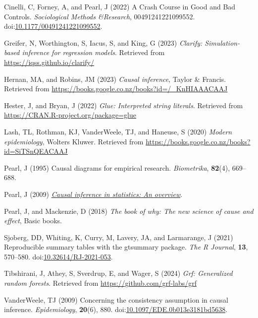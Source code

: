 \documentclass[
  singlecolumn]{article}
\newlength{\cslhangindent}
\newenvironment{CSLReferences}[2] %
 {\begin{list}{}{%
  \setlength{\itemindent}{0pt}
  \setlength{\leftmargin}{0pt}
  \setlength{\parsep}{0pt}
  \ifodd #1
   \setlength{\leftmargin}{\cslhangindent}
   \setlength{\itemindent}{-1\cslhangindent}
  \fi
  \setlength{\itemsep}{#2\baselineskip}}}
 {\end{list}}
\begin{document}
\label{refs}
\begin{CSLReferences}{1}{0}
Cinelli, C, Forney, A, and Pearl, J (2022) A Crash Course in Good and
Bad Controls. \emph{Sociological Methods \&Research}, 00491241221099552.
doi:\href{https://doi.org/10.1177/00491241221099552}{10.1177/00491241221099552}.

Greifer, N, Worthington, S, Iacus, S, and King, G (2023) \emph{Clarify:
Simulation-based inference for regression models}. Retrieved from
\url{https://iqss.github.io/clarify/}

Hernan, MA, and Robins, JM (2023) \emph{Causal inference}, Taylor \&
Francis. Retrieved from
\url{https://books.google.co.nz/books?id=/_KnHIAAACAAJ}

Hester, J, and Bryan, J (2022) \emph{Glue: Interpreted string literals}.
Retrieved from \url{https://CRAN.R-project.org/package=glue}

Lash, TL, Rothman, KJ, VanderWeele, TJ, and Haneuse, S (2020)
\emph{Modern epidemiology}, Wolters Kluwer. Retrieved from
\url{https://books.google.co.nz/books?id=SiTSnQEACAAJ}

Pearl, J (1995) Causal diagrams for empirical research.
\emph{Biometrika}, \textbf{82}(4), 669--688.

Pearl, J (2009) \emph{\href{https://doi.org/10.1214/09-SS057}{Causal
inference in statistics: An overview}}.

Pearl, J, and Mackenzie, D (2018) \emph{The book of why: The new science
of cause and effect}, Basic books.

Sjoberg, DD, Whiting, K, Curry, M, Lavery, JA, and Larmarange, J (2021)
Reproducible summary tables with the gtsummary package. \emph{{The R
Journal}}, \textbf{13}, 570--580.
doi:\href{https://doi.org/10.32614/RJ-2021-053}{10.32614/RJ-2021-053}.

Tibshirani, J, Athey, S, Sverdrup, E, and Wager, S (2024) \emph{Grf:
Generalized random forests}. Retrieved from
\url{https://github.com/grf-labs/grf}

VanderWeele, TJ (2009) Concerning the consistency assumption in causal
inference. \emph{Epidemiology}, \textbf{20}(6), 880.
doi:\href{https://doi.org/10.1097/EDE.0b013e3181bd5638}{10.1097/EDE.0b013e3181bd5638}.


\end{CSLReferences}
\end{document}
